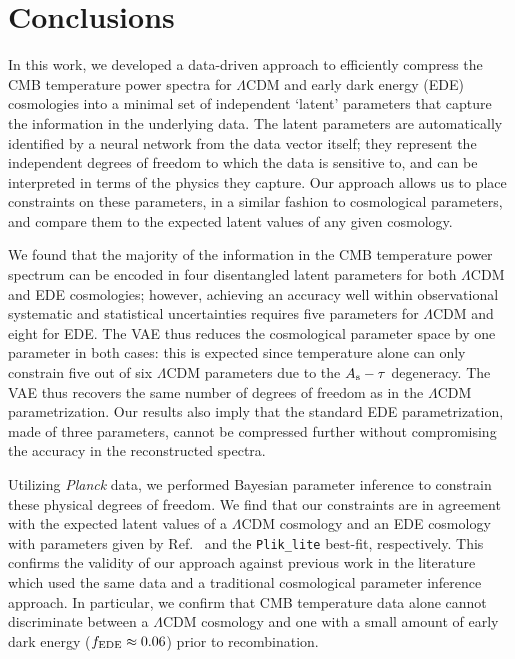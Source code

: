 \documentclass[aps, prd, reprint, superscriptaddress, nofootinbib, bibnotes]{revtex4-2}
\newcommand{\Planck}{\textit{Planck}}
\begin{document}
\section{Conclusions}
\label{sec:conclusions}
In this work, we developed a data-driven approach to efficiently compress the CMB temperature power spectra for $\Lambda$CDM and early dark energy (EDE) cosmologies into a minimal set of independent `latent' parameters that capture the information in the underlying data. The latent parameters are automatically identified by a neural network from the data vector itself; they represent the independent degrees of freedom to which the data is sensitive to, and can be interpreted in terms of the physics they capture. Our approach allows us to place constraints on these parameters, in a similar fashion to cosmological parameters, and compare them to the expected latent values of any given cosmology.

We found that the majority of the information in the CMB temperature power spectrum can be encoded in four disentangled latent parameters for both $\Lambda$CDM and EDE cosmologies; however, achieving an accuracy well within observational systematic and statistical uncertainties requires five parameters for $\Lambda$CDM and eight for EDE.
The VAE thus reduces the cosmological parameter space by one parameter in both cases: this is expected since temperature alone can only constrain five out of six $\Lambda$CDM parameters due to the $A_{\rm{s}} - \tau$ degeneracy. The VAE thus recovers the same number of degrees of freedom as in the $\Lambda$CDM parametrization. Our results also imply that the standard EDE parametrization, made of three parameters, cannot be compressed further without compromising the accuracy in the reconstructed spectra.

Utilizing \Planck{} data, we performed Bayesian parameter inference to constrain these physical degrees of freedom. We find that our constraints are in agreement with the expected latent values of a $\Lambda$CDM cosmology and an EDE cosmology with parameters given by Ref.~\cite{Planck:2019nip} and the \texttt{Plik\_lite} best-fit, respectively. This confirms the validity of our approach against previous work in the literature which used the same data and a traditional cosmological parameter inference approach. In particular, we confirm that CMB temperature data alone cannot discriminate between a $\Lambda$CDM cosmology and one with a small amount of early dark energy ($f_{\rm EDE} \approx 0.06$) prior to recombination.
\end{document}
